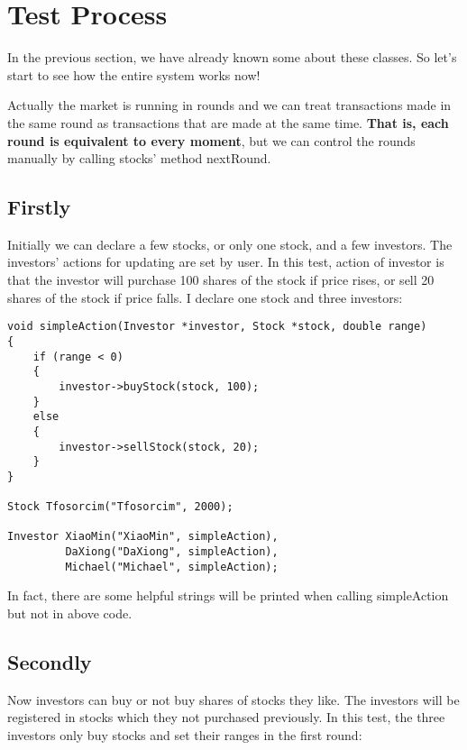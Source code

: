 \documentclass{article}
\begin{document}
\section{Test Process}

    In the previous section, we have already known some about these classes. So let's start to see how the entire system works now!
    
    Actually the market is running in rounds and we can treat transactions made in the same round as transactions that are made at the same time. \textbf{That is, each round is equivalent to every moment}, but we can control the rounds manually by calling stocks' method nextRound.
    
\subsection{Firstly}    
    
    Initially we can declare a few stocks, or only one stock, and a few investors. The investors' actions for updating are set by user. In this test, action of investor is that the investor will purchase 100 shares of the stock if price rises, or sell 20 shares of the stock if price falls. I declare one stock and three investors:
    
\begin{lstlisting}
void simpleAction(Investor *investor, Stock *stock, double range)
{
    if (range < 0)
    {
        investor->buyStock(stock, 100);
    }
    else
    {
        investor->sellStock(stock, 20);
    }
}

Stock Tfosorcim("Tfosorcim", 2000);

Investor XiaoMin("XiaoMin", simpleAction),
         DaXiong("DaXiong", simpleAction),
         Michael("Michael", simpleAction);

\end{lstlisting}

    In fact, there are some helpful strings will be printed when calling simpleAction but not in above code.
    
\subsection{Secondly}    
  
    Now investors can buy or not buy shares of stocks they like. The investors will be registered in stocks which they not purchased previously. In this test, the three investors only buy stocks and set their ranges in the first round:
    
\end{document}
